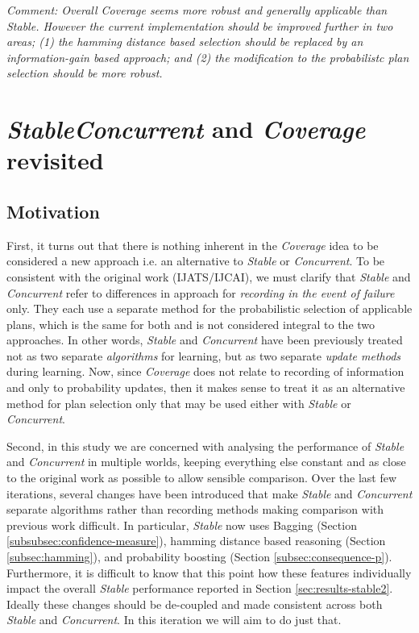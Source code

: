 \documentclass[a4paper]{article}
\newcommand{\cc}{\emph{Concurrent}\xspace}
\newcommand{\st}{\emph{Stable}\xspace}
\newcommand{\cov}{\emph{Coverage}\xspace}
\begin{document}
\textit{Comment: Overall \cov seems more robust and generally applicable than \st. However the current implementation should be improved further in two areas; (1) the hamming distance based selection should be replaced by an information-gain based approach; and  (2) the modification to the probabilistc plan selection should be more robust.
}

\section{\st \cc and \cov revisited}
\label{sec:coverage3}

\subsection{Motivation}
\label{subsec:coverage3-motivation}

First, it turns out that there is nothing inherent in the \cov idea to be considered a new approach i.e. an alternative to \st or \cc. To be consistent with the original work (IJATS/IJCAI), we must clarify that \st and \cc refer to differences in approach for \textit{recording in the event of failure} only. They each use a separate method for the probabilistic selection of applicable plans, which is the same for both and is not considered integral to the two approaches. In other words, \st and \cc have been previously treated not as two separate \textit{algorithms} for learning, but as two separate \textit{update methods} during learning. Now, since \cov does not relate to recording of information and only to probability updates, then it makes sense to treat it as an alternative method for plan selection only that may be used either with \st or \cc. 

Second, in this study we are concerned with analysing the performance of \st and \cc in multiple worlds, keeping everything else constant and as close to the original work as possible to allow sensible comparison. Over the last few iterations, several changes have been introduced that make \st and \cc separate algorithms rather than recording methods making comparison with previous work difficult. In particular, \st now uses Bagging (Section \ref{subsubsec:confidence-measure}), hamming distance based reasoning (Section \ref{subsec:hamming}), and probability boosting (Section \ref{subsec:consequence-p}). Furthermore, it is difficult to know that this point how these features individually impact the overall \st performance reported in Section \ref{sec:results-stable2}. Ideally these changes should be de-coupled and made consistent across both \st and \cc. In this iteration we will aim to do just that. 
\end{document}
